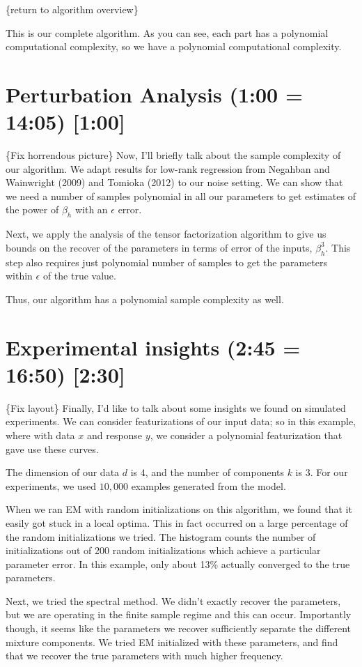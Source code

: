\documentclass[tablecaption=bottom]{jmlr}
\begin{document}
\{return to algorithm overview\}

This is our complete algorithm. As you can see, each part has a
polynomial computational complexity, so we have a polynomial
computational complexity.

\section{Perturbation Analysis (1:00 = 14:05) {[}1:00{]}}

\{Fix horrendous picture\} Now, I'll briefly talk about the sample
complexity of our algorithm. We adapt results for low-rank regression
from Negahban and Wainwright (2009) and Tomioka (2012) to our noise
setting. We can show that we need a number of samples polynomial in all
our parameters to get estimates of the power of $\beta_h$ with an
$\epsilon$ error.

Next, we apply the analysis of the tensor factorization algorithm to
give us bounds on the recover of the parameters in terms of error of the
inputs, $\beta_h^3$. This step also requires just polynomial number of
samples to get the parameters within $\epsilon$ of the true value.

Thus, our algorithm has a polynomial sample complexity as well.

\section{Experimental insights (2:45 = 16:50) {[}2:30{]}}

\{Fix layout\} Finally, I'd like to talk about some insights we found on
simulated experiments. We can consider featurizations of our input data;
so in this example, where with data $x$ and response $y$, we consider a
polynomial featurization that gave use these curves.

The dimension of our data $d$ is $4$, and the number of components $k$
is $3$. For our experiments, we used $10,000$ examples generated from
the model.

When we ran EM with random initializations on this algorithm, we found
that it easily got stuck in a local optima. This in fact occurred on a
large percentage of the random initializations we tried. The histogram
counts the number of initializations out of 200 random initializations
which achieve a particular parameter error. In this example, only about
13\% actually converged to the true parameters.

Next, we tried the spectral method. We didn't exactly recover the
parameters, but we are operating in the finite sample regime and this
can occur. Importantly though, it seems like the parameters we recover
sufficiently separate the different mixture components. We tried EM
initialized with these parameters, and find that we recover the true
parameters with much higher frequency.
\end{document}
